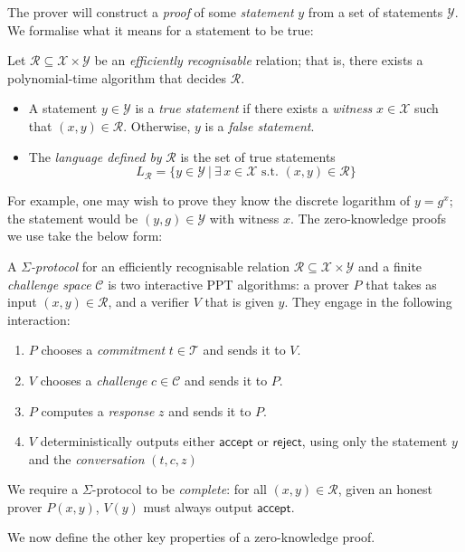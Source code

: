 \documentclass[12pt,a4paper]{article}
\theoremstyle{definition}
\newcounter{protocol}
\begin{document}
The prover will construct a \textit{proof} of some \textit{statement} $y$ from a set of statements $\mathcal{Y}$. We formalise what it means for a statement to be true:
\begin{definition}
    Let $\mathcal{R}\subseteq\mathcal{X}\times\mathcal{Y}$ be an \textit{efficiently recognisable} relation; that is, there exists a polynomial-time algorithm that decides $\mathcal{R}$.
    \begin{itemize}
        \item A statement $y\in\mathcal{Y}$ is a \textit{true statement} if there exists a \textit{witness} $x\in\mathcal{X}$ such that $(x, y)\in\mathcal{R}$. Otherwise, $y$ is a \textit{false statement}.
        \item The \textit{language defined by} $\mathcal{R}$ is the set of true statements
        $$L_\mathcal{R}=\{y\in\mathcal{Y}\ |\ \exists\, x\in\mathcal{X}\text{ s.t. }(x,y)\in\mathcal{R}\}$$
    \end{itemize}
\end{definition}
For example, one may wish to prove they know the discrete logarithm of $y=g^x$; the statement would be $(y, g)\in\mathcal{Y}$ with witness $x$. The zero-knowledge proofs we use take the below form:
\begin{definition}
    A $\mathit{\Sigma}$\textit{-protocol} for an efficiently recognisable relation $\mathcal{R}\subseteq\mathcal{X}\times\mathcal{Y}$ and a finite \textit{challenge space} $\mathcal{C}$ is two interactive PPT algorithms: a prover $P$ that takes as input $(x, y)\in\mathcal{R}$, and a verifier $V$ that is given $y$. They engage in the following interaction:
    \begin{enumerate}
        \item $P$ chooses a \textit{commitment} $t\in\mathcal{T}$ and sends it to $V$.
        \item $V$ chooses a \textit{challenge} $c\in\mathcal{C}$ and sends it to $P$.
        \item $P$ computes a \textit{response} $z$ and sends it to $P$.
        \item $V$ deterministically outputs either $\mathsf{accept}$ or $\mathsf{reject}$, using only the statement $y$ and the \textit{conversation} $(t, c, z)$
    \end{enumerate}
    We require a $\Sigma$-protocol to be \textit{complete}: for all $(x, y)\in\mathcal{R}$, given an honest prover $P(x, y)$, $V(y)$ must always output $\mathsf{accept}$.
\end{definition}
We now define the other key properties of a zero-knowledge proof.
\end{document}
